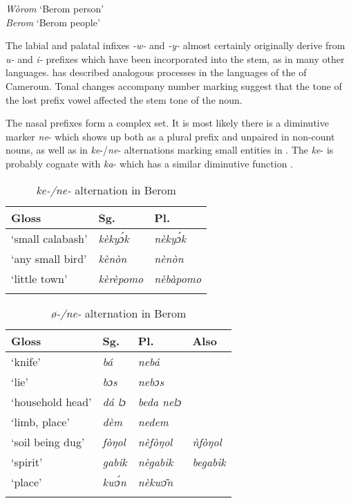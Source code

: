 \documentclass[output=paper]{langsci/langscibook}
\begin{document}
\ea\label{ex:nomaffplat:4}
{  \textit{Wòrom}  ‘Berom person’ \\        \textit{Berom}   ‘Berom people’}\\
\z

The labial and palatal infixes \textit{-w-} and \textit{-y-} almost certainly originally derive from \textit{u-} and \textit{i-} prefixes which have been incorporated into the stem, as in many other  languages. \citet{KiesslingMutations2010} has described analogous processes in the languages of the  of Cameroun. Tonal changes accompany number marking suggest that the tone of the lost prefix vowel affected the stem tone of the noun.

The nasal prefixes form a complex set. It is most likely there is a diminutive marker \textit{ne}- which shows up both as a plural prefix and unpaired in non-count nouns, as well as in \textit{ke}-/\textit{ne}- alternations marking small entities in . The \textit{ke}- is probably cognate with  \textit{ka}- which has a similar diminutive function \citep[88]{Maho1999}.


\begin{table}
 \caption{\textit{ke-/ne-} alternation in Berom} 
\label{extab:nomaffplat:5}
\begin{tabularx}{.75\textwidth}{XXl}
\lsptoprule
Gloss 	& {Sg.} 	& {Pl.}\\
\midrule
‘small calabash’ 	& \itshape kèkyɔ́k 	& \itshape nèkyɔ́k\\
‘any small bird’ 	& \itshape kènòn 	& \itshape nènòn\\
‘little town’ 	& \itshape kèrèpomo 	& \itshape nèbàpomo\\
\lspbottomrule
\end{tabularx}
\end{table}

 
\begin{table}[p]
\caption{\textit{ø-/ne-} alternation in Berom} 
\label{extab:nomaffplat:6}
\begin{tabularx}{.75\textwidth}{lXXl}
\lsptoprule
   Gloss 	&     {Sg.} 	&     {Pl.} 	&   Also\\
   \midrule
‘knife’ 	&  \itshape bá 	&  \itshape nebá 	& \\
‘lie’ 	&  \itshape bɔs 	&  \itshape nebɔs 	& \\
‘household head’ 	&  \itshape dá lɔ 	&  \itshape beda nelɔ 	& \\
‘limb, place’ 	&  \itshape dèm 	&  \itshape nedem 	& \\
‘soil being dug’ 	&  \textit{fòŋol}  	&  \textit{nèfòŋol}  	&  \textit{ǹfòŋol}\\
‘spirit’ 	&  \itshape gabik 	&  \itshape nègabik 	&  \itshape begabik\\
‘place’ 	&  \itshape kwɔ́n 	&  \itshape nèkwɔ̄n 	& \\
\lspbottomrule
\end{tabularx}
\end{table}
\end{document}
